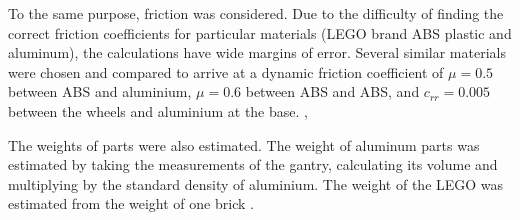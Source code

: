 \documentclass{article}
\begin{document}
To the same purpose, friction was considered. Due to the difficulty of finding the correct friction coefficients for particular materials (LEGO brand ABS plastic and aluminum), the calculations have wide margins of error. Several similar materials were chosen and compared to arrive at a dynamic friction coefficient of \(\mu = 0.5\) between ABS and aluminium, \( \mu = 0.6 \) between ABS and ABS, and \( c_{rr} = 0.005 \) between the wheels and aluminium at the base. \cite{friction1}, \cite{friction2}

The weights of parts were also estimated. The weight of aluminum parts was estimated by taking the measurements of the gantry, calculating its volume and multiplying by the standard density of aluminium. The weight of the LEGO was estimated from the weight of one brick \cite{legoweight}.
\end{document}
